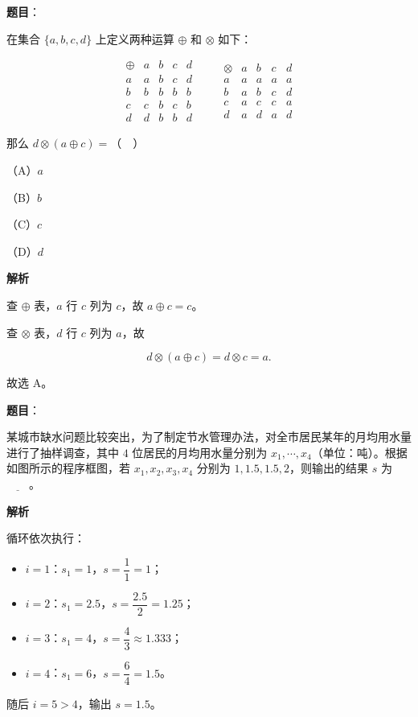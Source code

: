 \begin{answer}

\textbf{题目}：

在集合 $\{a,b,c,d\}$ 上定义两种运算 $\oplus$ 和 $\otimes$ 如下：

\nopagebreak[4]
\[
\begin{array}{c|cccc}
\oplus & a & b & c & d\\\hline
a & a & b & c & d\\
b & b & b & b & b\\
c & c & b & c & b\\
d & d & b & b & d
\end{array}
\qquad
\begin{array}{c|cccc}
\otimes & a & b & c & d\\\hline
a & a & a & a & a\\
b & a & b & c & d\\
c & a & c & c & a\\
d & a & d & a & d
\end{array}
\]

那么 $d\otimes(a\oplus c)=$（　）

（A）$a$

（B）$b$

（C）$c$

（D）$d$

\textbf{解析}

查 $\oplus$ 表，$a$ 行 $c$ 列为 $c$，故 $a\oplus c=c$。

查 $\otimes$ 表，$d$ 行 $c$ 列为 $a$，故

\nopagebreak[4]
\[d\otimes(a\oplus c)=d\otimes c=a.\]

故选 A。


\end{answer}
\begin{answer}

\textbf{题目}：

某城市缺水问题比较突出，为了制定节水管理办法，对全市居民某年的月均用水量进行了抽样调查，其中 $4$ 位居民的月均用水量分别为 $x_1,\cdots,x_4$（单位：吨）。根据如图所示的程序框图，若 $x_1,x_2,x_3,x_4$ 分别为 $1,1.5,1.5,2$，则输出的结果 $s$ 为$\underline{\qquad}$。
\nopagebreak[4]
\begin{center}\end{center}
\nopagebreak[4]
\textbf{解析}

循环依次执行：

\begin{itemize}
\item $i=1$：$s_1=1$，$s=\dfrac11=1$；
\item $i=2$：$s_1=2.5$，$s=\dfrac{2.5}{2}=1.25$；
\item $i=3$：$s_1=4$，$s=\dfrac43\approx1.333$；
\item $i=4$：$s_1=6$，$s=\dfrac64=1.5$。
\end{itemize}

随后 $i=5>4$，输出 $s=1.5$。


\end{answer}
